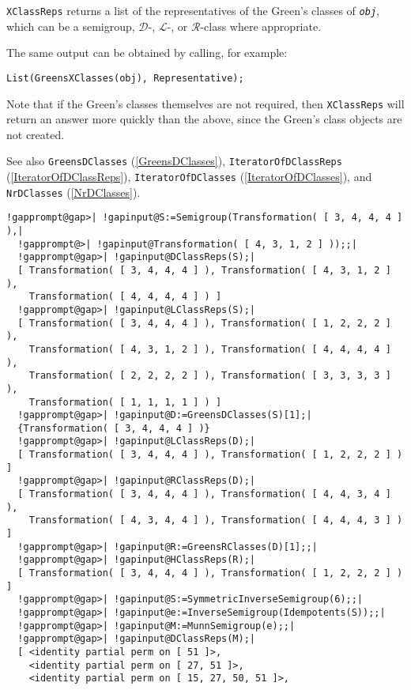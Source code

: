 \documentclass[a4paper,11pt]{report}
\begin{document}
{{{ \texttt{XClassReps} returns a list of the representatives of the Green's classes of \mbox{\texttt{\mdseries\slshape obj}}, which can be a semigroup, $\mathcal{D}$-, $\mathcal{L}$-, or $\mathcal{R}$-class where appropriate.

 The same output can be obtained by calling, for example: 
\begin{Verbatim}[commandchars=!@|,fontsize=\small,frame=single,label=Example]
  List(GreensXClasses(obj), Representative);
\end{Verbatim}
 Note that if the Green's classes themselves are not required, then \texttt{XClassReps} will return an answer more quickly than the above, since the Green's class
objects are not created.

 See also \texttt{GreensDClasses} (\ref{GreensDClasses}), \texttt{IteratorOfDClassReps} (\ref{IteratorOfDClassReps}), \texttt{IteratorOfDClasses} (\ref{IteratorOfDClasses}), and \texttt{NrDClasses} (\ref{NrDClasses}). 
\begin{Verbatim}[commandchars=!@|,fontsize=\small,frame=single,label=Example]
  !gapprompt@gap>| !gapinput@S:=Semigroup(Transformation( [ 3, 4, 4, 4 ] ),|
  !gapprompt@>| !gapinput@Transformation( [ 4, 3, 1, 2 ] ));;|
  !gapprompt@gap>| !gapinput@DClassReps(S);|
  [ Transformation( [ 3, 4, 4, 4 ] ), Transformation( [ 4, 3, 1, 2 ] ), 
    Transformation( [ 4, 4, 4, 4 ] ) ]
  !gapprompt@gap>| !gapinput@LClassReps(S);|
  [ Transformation( [ 3, 4, 4, 4 ] ), Transformation( [ 1, 2, 2, 2 ] ), 
    Transformation( [ 4, 3, 1, 2 ] ), Transformation( [ 4, 4, 4, 4 ] ), 
    Transformation( [ 2, 2, 2, 2 ] ), Transformation( [ 3, 3, 3, 3 ] ), 
    Transformation( [ 1, 1, 1, 1 ] ) ]
  !gapprompt@gap>| !gapinput@D:=GreensDClasses(S)[1];|
  {Transformation( [ 3, 4, 4, 4 ] )}
  !gapprompt@gap>| !gapinput@LClassReps(D);|
  [ Transformation( [ 3, 4, 4, 4 ] ), Transformation( [ 1, 2, 2, 2 ] ) ]
  !gapprompt@gap>| !gapinput@RClassReps(D);|
  [ Transformation( [ 3, 4, 4, 4 ] ), Transformation( [ 4, 4, 3, 4 ] ), 
    Transformation( [ 4, 3, 4, 4 ] ), Transformation( [ 4, 4, 4, 3 ] ) ]
  !gapprompt@gap>| !gapinput@R:=GreensRClasses(D)[1];;|
  !gapprompt@gap>| !gapinput@HClassReps(R);|
  [ Transformation( [ 3, 4, 4, 4 ] ), Transformation( [ 1, 2, 2, 2 ] ) ]
  !gapprompt@gap>| !gapinput@S:=SymmetricInverseSemigroup(6);;|
  !gapprompt@gap>| !gapinput@e:=InverseSemigroup(Idempotents(S));;|
  !gapprompt@gap>| !gapinput@M:=MunnSemigroup(e);;|
  !gapprompt@gap>| !gapinput@DClassReps(M);|
  [ <identity partial perm on [ 51 ]>, 
    <identity partial perm on [ 27, 51 ]>, 
    <identity partial perm on [ 15, 27, 50, 51 ]>, 

\end{Verbatim}}}}
\end{document}

